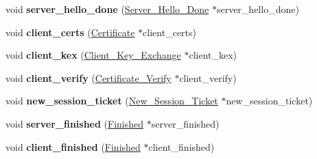 \begin{DoxyCompactItemize}
void {\bfseries server\+\_\+hello\+\_\+done} (\mbox{\hyperlink{class_botan_1_1_t_l_s_1_1_server___hello___done}{Server\+\_\+\+Hello\+\_\+\+Done}} $\ast$server\+\_\+hello\+\_\+done)
\item 
\mbox{\label{class_botan_1_1_t_l_s_1_1_handshake___state_a467b52b0f5eb08d770682ee97bfe80ca}} 
void {\bfseries client\+\_\+certs} (\mbox{\hyperlink{class_botan_1_1_t_l_s_1_1_certificate}{Certificate}} $\ast$client\+\_\+certs)
\item 
\mbox{\label{class_botan_1_1_t_l_s_1_1_handshake___state_a85b73e078667c796ae1dd559b39f1951}} 
void {\bfseries client\+\_\+kex} (\mbox{\hyperlink{class_botan_1_1_t_l_s_1_1_client___key___exchange}{Client\+\_\+\+Key\+\_\+\+Exchange}} $\ast$client\+\_\+kex)
\item 
\mbox{\label{class_botan_1_1_t_l_s_1_1_handshake___state_a280ef4df28f06e408d8a3f38d1caf373}} 
void {\bfseries client\+\_\+verify} (\mbox{\hyperlink{class_botan_1_1_t_l_s_1_1_certificate___verify}{Certificate\+\_\+\+Verify}} $\ast$client\+\_\+verify)
\item 
\mbox{\label{class_botan_1_1_t_l_s_1_1_handshake___state_a41044f93e257d2b8ed95546de61505dc}} 
void {\bfseries new\+\_\+session\+\_\+ticket} (\mbox{\hyperlink{class_botan_1_1_t_l_s_1_1_new___session___ticket}{New\+\_\+\+Session\+\_\+\+Ticket}} $\ast$new\+\_\+session\+\_\+ticket)
\item 
\mbox{\label{class_botan_1_1_t_l_s_1_1_handshake___state_ab4fb29eae2b09e9355f1d01e9bba98ce}} 
void {\bfseries server\+\_\+finished} (\mbox{\hyperlink{class_botan_1_1_t_l_s_1_1_finished}{Finished}} $\ast$server\+\_\+finished)
\item 
\mbox{\label{class_botan_1_1_t_l_s_1_1_handshake___state_ac1764ccb52ef305c738c643b045a87b4}} 
void {\bfseries client\+\_\+finished} (\mbox{\hyperlink{class_botan_1_1_t_l_s_1_1_finished}{Finished}} $\ast$client\+\_\+finished)
\item 
\mbox{\label{class_botan_1_1_t_l_s_1_1_handshake___state_a2a938392277a2242beafd48de8ee44e6}} 

\end{DoxyCompactItemize}
